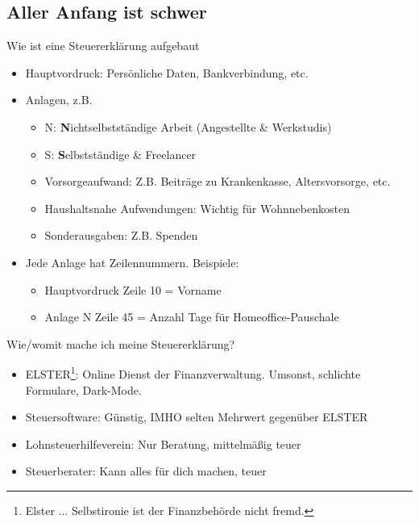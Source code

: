 \documentclass{beamer}
\begin{document}
		\subsection{Aller Anfang ist schwer}

			\begin{frame}{Wie ist eine Steuererklärung aufgebaut}
				\begin{itemize}
					\item Hauptvordruck: Persönliche Daten, Bankverbindung, etc.
					\item Anlagen, z.B.
					\begin{itemize}
						\item N: \textbf{N}ichtselbstständige Arbeit (Angestellte \& Werkstudis)
						\item S: \textbf{S}elbstständige \& Freelancer
						\item Vorsorgeaufwand: Z.B. Beiträge zu Krankenkasse, Altersvorsorge, etc.
						\item Haushaltsnahe Aufwendungen: Wichtig für Wohnnebenkosten
						\item Sonderausgaben: Z.B. Spenden
					\end{itemize}
					\item Jede Anlage hat Zeilennummern. Beispiele:
					\begin{itemize}
						\item Hauptvordruck Zeile 10 = Vorname
						\item Anlage N Zeile 45 = Anzahl Tage für Homeoffice-Pauschale
					\end{itemize}
				\end{itemize}
			\end{frame}

			\begin{frame}{Wie/womit mache ich meine Steuererklärung?}
				\begin{itemize}
					\item ELSTER\footnote{Elster ... Selbstironie ist der Finanzbehörde nicht fremd.}: Online Dienst der Finanzverwaltung. Umsonst, schlichte Formulare, Dark-Mode.
					\item Steuersoftware: Günstig, IMHO selten Mehrwert gegenüber ELSTER
					\item Lohnsteuerhilfeverein: Nur Beratung, mittelmäßig teuer
					\item Steuerberater: Kann alles für dich machen, teuer
				\end{itemize}
			\end{frame}
		
\end{document}
